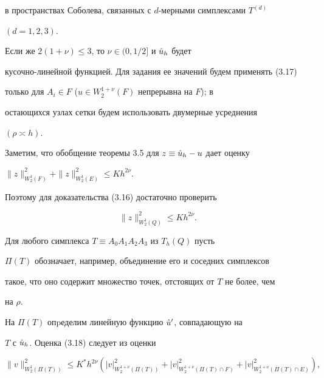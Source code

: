 в пространствах Соболева, связанных с $d$-мерными симплексами $T^{(d)}$


$(d=1,2,3).$





Если же $2(1+\nu)\le 3$, то $\nu\in(0,1/2]$ и $\Hat u_h$ будет


кусочно-линейной функцией. Для задания ее значений будем применять (3.17)


только для $A_i\in F$ ($u\in W_2^{1+\nu}(F)$ непрерывна на $F$); в


остающихся узлах сетки будем использовать двумерные усред\-нения


$(\rho\asymp h).$





Заметим, что обобщение теоремы 3.5 для $z\equiv\Hat u_h-u$ дает оценку


$\|z\|^2_{W_2^1(F)}+\|z\|^2_{W_2^1(E)}\le Kh^{2\nu}.$





Поэтому для доказательства (3.16) достаточно проверить


\begin{equation}


\|z\|^2_{W_2^1(Q)}\le Kh^{2\nu}.


\end{equation}





Для любого симплекса $T\equiv A_0A_1A_2A_3$ из $T_h(Q)$ пусть


$\Pi(T)$ обозначает, например, объединение его и соседних симплексов


такое, что оно содержит множество точек, отстоящих от $T$ не более, чем


на $\rho$.


На $\Pi(T)$ опpеделим линейную функцию $\Hat u'$, совпадающую на


$T$ с $\Hat u_h$. Оценка (3.18) следует из оценки


\begin{equation}


\|v\|^2_{W_2^1(\Pi(T))}\le K^*h^{2\nu}


\left( |v|^2_{W_2^{1+\nu}(\Pi(T))}


+|v|^2_{W_2^{1+\nu}(\Pi(T)\cap F)}+


|v|^2_{W_2^{1+\nu}(\Pi(T)\cap E)}\right),


\end{equation}


